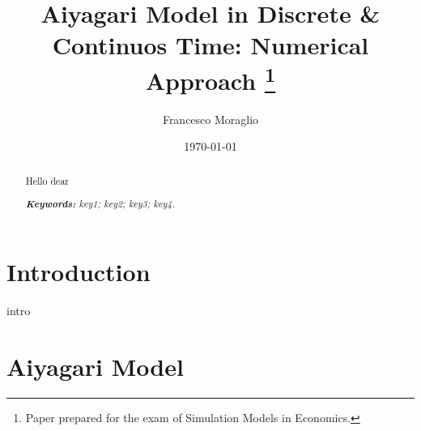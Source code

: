 \documentclass[12pt]{article}
\title{Aiyagari Model in Discrete \& Continuos Time: Numerical Approach
\thanks{Paper prepared for the exam of Simulation Models in Economics.}
}
\author{Francesco Moraglio}
\date{\today}
\begin{document}
\maketitle

\begin{abstract}
Hello dear 

\noindent
\textit{\textbf{Keywords: }%
key1; key2; key3; key4.} \\ %

\end{abstract}

\section{Introduction}
intro
\section{Aiyagari Model}
\end{document}
